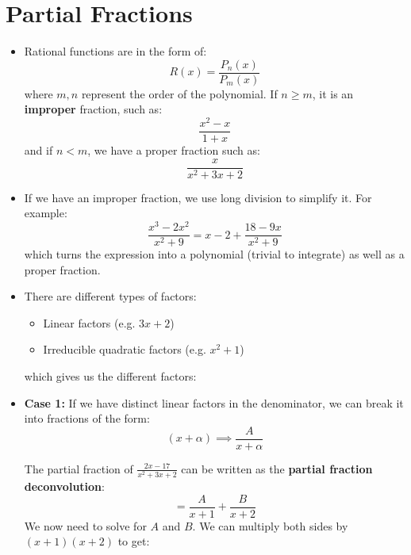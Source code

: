 \section{Partial Fractions}
\begin{itemize}
    \item Rational functions are in the form of:
    \begin{equation}
        R(x) = \frac{P_n(x)}{P_m(x)}
    \end{equation}
    where $m,n$ represent the order of the polynomial. If $n \ge m$, it is an \textbf{improper} fraction, such as:
    \begin{equation}
        \frac{x^2-x}{1+x}
    \end{equation}
    and if $n < m$, we have a proper fraction such as:
    \begin{equation}
        \frac{x}{x^2+3x+2}
    \end{equation}
    \item If we have an improper fraction, we use long division to simplify it. For example:
    \begin{equation}
        \frac{x^3-2x^2}{x^2+9} = x - 2 + \frac{18-9x}{x^2+9}
    \end{equation}
    which turns the expression into a polynomial (trivial to integrate) as well as a proper fraction.
    \item There are different types of factors:
    \begin{itemize}
        \item Linear factors (e.g. $3x+2$)
        \item Irreducible quadratic factors (e.g. $x^2+1$)
    \end{itemize}
    which gives us the different factors:
    \item \textbf{Case 1:} If we have distinct linear factors in the denominator, we can break it into fractions of the form:
    \begin{equation}
        (x+\alpha) \implies \frac{A}{x+\alpha}
    \end{equation}
    \begin{example}
        The partial fraction of $\frac{2x-17}{x^2+3x+2}$ can be written as the \textbf{partial fraction deconvolution}:
        \begin{equation}
            = \frac{A}{x+1} + \frac{B}{x+2}
        \end{equation}
        We now need to solve for $A$ and $B$. We can multiply both sides by $(x+1)(x+2)$ to get:
        \begin{align}

\end{align}
\end{example}
\end{itemize}
